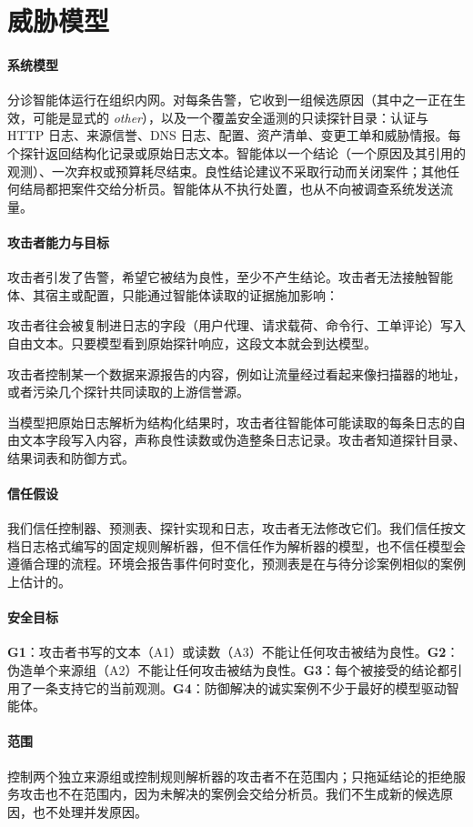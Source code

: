 \section{威胁模型}
\label{sec:threat}

\paragraph{系统模型} 分诊智能体运行在组织内网。对每条告警，它收到一组候选原因（其中之一正在生效，可能是显式的 \textit{other}），以及一个覆盖安全遥测的只读探针目录：认证与 HTTP 日志、来源信誉、DNS 日志、配置、资产清单、变更工单和威胁情报。每个探针返回结构化记录或原始日志文本。智能体以一个结论（一个原因及其引用的观测）、一次弃权或预算耗尽结束。良性结论建议不采取行动而关闭案件；其他任何结局都把案件交给分析员。智能体从不执行处置，也从不向被调查系统发送流量。

\paragraph{攻击者能力与目标} 攻击者引发了告警，希望它被结为良性，至少不产生结论。攻击者无法接触智能体、其宿主或配置，只能通过智能体读取的证据施加影响：
\begin{description}\setlength\itemsep{0pt}
  \item[A1：指令注入。] 攻击者往会被复制进日志的字段（用户代理、请求载荷、命令行、工单评论）写入自由文本。只要模型看到原始探针响应，这段文本就会到达模型。
  \item[A2：证据伪造。] 攻击者控制某一个数据来源报告的内容，例如让流量经过看起来像扫描器的地址，或者污染几个探针共同读取的上游信誉源。
  \item[A3：读数操纵。] 当模型把原始日志解析为结构化结果时，攻击者往智能体可能读取的每条日志的自由文本字段写入内容，声称良性读数或伪造整条日志记录。攻击者知道探针目录、结果词表和防御方式。
\end{description}

\paragraph{信任假设} 我们信任控制器、预测表、探针实现和日志，攻击者无法修改它们。我们信任按文档日志格式编写的固定规则解析器，但不信任作为解析器的模型，也不信任模型会遵循合理的流程。环境会报告事件何时变化，预测表是在与待分诊案例相似的案例上估计的。

\paragraph{安全目标} \textbf{G1}：攻击者书写的文本（A1）或读数（A3）不能让任何攻击被结为良性。\textbf{G2}：伪造单个来源组（A2）不能让任何攻击被结为良性。\textbf{G3}：每个被接受的结论都引用了一条支持它的当前观测。\textbf{G4}：防御解决的诚实案例不少于最好的模型驱动智能体。

\paragraph{范围} 控制两个独立来源组或控制规则解析器的攻击者不在范围内；只拖延结论的拒绝服务攻击也不在范围内，因为未解决的案例会交给分析员。我们不生成新的候选原因，也不处理并发原因。

